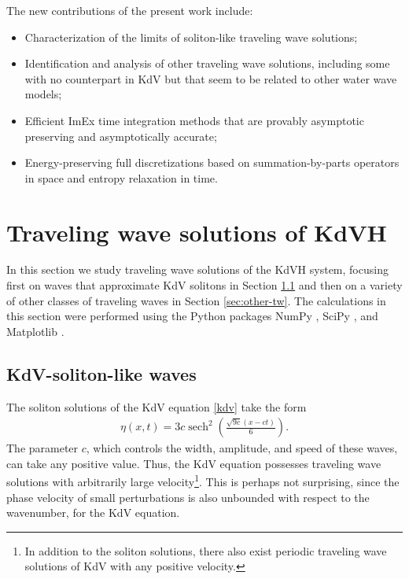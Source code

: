 \documentclass{article}
\DeclareMathOperator{\sech}{sech}
\newcommand{\ukdv}{\eta}
\begin{document}
The new contributions of the present work include:
\begin{itemize}
    \item Characterization of the limits of soliton-like traveling wave solutions;
    \item Identification and analysis of other traveling wave solutions, including
            some with no counterpart in KdV but that seem to be related to other
            water wave models;
    \item Efficient ImEx time integration methods that are provably asymptotic preserving
            and asymptotically accurate;
    \item Energy-preserving full discretizations based on summation-by-parts operators in space and entropy 
    relaxation in time.
\end{itemize}

\section{Traveling wave solutions of KdVH}\label{sec:traveling-waves}
In this section we study traveling wave solutions of the KdVH system, focusing
first on waves that approximate KdV solitons in Section \ref{sec:soliton}
and then on a variety of other classes of traveling waves in Section \ref{sec:other-tw}.
The calculations in this section were performed using the Python packages
NumPy \cite{harris2020array}, SciPy \cite{virtanen2020scipy},
and Matplotlib \cite{hunter2007matplotlib}.

\subsection{KdV-soliton-like waves} \label{sec:soliton}
The soliton solutions of the KdV equation \eqref{kdv} take the form
\begin{align} \label{soliton}
    \ukdv(x,t) = 3c \sech^2\left(\frac{\sqrt{9c}(x-ct)}{6}\right).
\end{align}
The parameter $c$, which controls the width, amplitude, and speed of these
waves, can take any positive value.  Thus, the KdV equation possesses traveling
wave solutions with arbitrarily large velocity\footnote{In addition to the
soliton solutions, there also exist periodic traveling wave solutions of KdV
with any positive velocity.}.  This is perhaps not surprising, since the
phase velocity of small perturbations is also unbounded with respect to the wavenumber,
for the KdV equation.
\end{document}
